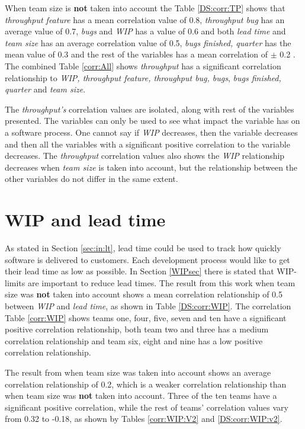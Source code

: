 \documentclass[UKenglish]{ifimaster}  %
\begin{document}
When team size is \textbf{not} taken into account the Table \ref{DS:corr:TP} shows that \textit{throughput feature} has a mean correlation value of 0.8, \textit{throughput bug} has an average value of 0.7, \textit{bugs} and \textit{WIP} has a value of 0.6 and both \textit{lead time} and \textit{team size} has an average correlation value of 0.5, \textit{bugs finished, quarter} has the mean value of 0.3 and the rest of the variables has a mean correlation of $\pm$ 0.2 . The combined Table \ref{corr:All} shows \textit{throughput} has a significant correlation relationship to \textit{WIP, throughput feature, throughput bug, bugs}, \textit{bugs finished, quarter} and \textit{team size}. 

The \textit{throughput's} correlation values are isolated, along with rest of the variables presented. The variables can only be used to see what impact the variable has on a software process. One cannot say if \textit{WIP} decreases, then the variable decreases and then all the variables with a significant positive correlation to the variable decreases. The \textit{throughput} correlation values also shows the \textit{WIP} relationship decreases when \textit{team size} is taken into account, but the relationship between the other variables do not differ in the same extent.




\section{WIP and lead time}
\vspace{-1em}
As stated in Section \ref{sec:in:lt}, lead time could be used to track how quickly software is delivered to customers. Each development process would like to get their lead time as low as possible. In Section \ref{WIPsec} there is stated that WIP-limits are important to reduce lead times. The result from this work when team size was \textbf{not} taken into account shows a mean correlation relationship of 0.5 between \textit{WIP} and \textit{lead time},  as shown in Table \ref{DS:corr:WIP}.  The correlation Table \ref{corr:WIP} shows teams one, four, five, seven and ten have a significant positive correlation relationship, both team two and three has a medium correlation relationship and team six, eight and nine has a low positive correlation relationship.

The result from when team size was taken into account shows an average correlation relationship of 0.2, which is a weaker correlation relationship than when team size was \textbf{not} taken into account. Three of the ten teams have a significant positive correlation, while the rest of teams' correlation values vary from 0.32 to -0.18, as shown by Tables \ref{corr:WIP:V2} and \ref{DS:corr:WIP:v2}. 
\end{document}
